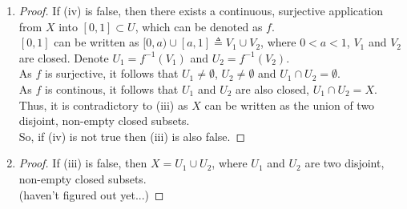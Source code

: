 \documentclass[paper=a4, fontsize=11pt]{scrartcl} %
\numberwithin{equation}{section} %
\numberwithin{figure}{section} %
\numberwithin{table}{section} %
\begin{document}
\begin{enumerate}
\begin{proof}
\begin{enumerate}
					So, $U_1$ and $U_2$ are both open and closed in $X$, which is contradictory to (i).\\
					Thus the assumption fails and (iii) is true when (i) is true.
				\item (iii) $\Rightarrow$ (i)\\
					Suppose (i) is not true, which means there exists $U$ s.t. $U \subset X$, $U \neq \emptyset$ and $U$ is both open and closed in $X$.\\
					Thus, $U^\complement$ is closed as $U$ is open.\\
					As $X = U \cup U^\complement$, then $X$ can be written as the union of two disjoint, non-empty closed subsets, which is contradictory to (iii).\\
					Thus the assumption fails and (i) holds true when (iii) is true. 
			\end{enumerate}
		\end{proof}
	\item
		\begin{proof}
			If (iv) is false, then there exists a continuous, surjective application from $X$ into $[0, 1]\subset U$, which can be denoted as $f$.\\
			$[0, 1]$ can be written as $[0, a) \cup [a, 1] \triangleq V_1 \cup V_2$, where $0 < a < 1$, $V_1$ and $V_2$ are closed. Denote $U_1 = f^{-1}(V_1)$ and  $U_2 = f^{-1}(V_2)$. \\
			As $f$ is surjective, it follows that $U_1 \neq \emptyset$, $U_2 \neq \emptyset$ and $U_1 \cap U_2 = \emptyset$. \\
			As $f$ is continous, it follows that $U_1$ and $U_2$ are also closed, $U_1 \cap U_2 = X$.\\
			Thus, it is contradictory to (iii) as $X$ can be written as the union of two disjoint, non-empty closed subsets.\\
			So, if (iv) is not true then (iii) is also false.
		\end{proof}
	\item 
		\begin{proof}
			If (iii) is false, then $X = U_1 \cup U_2$, where $U_1$ and $U_2$ are two disjoint, non-empty closed subsets.\\
			(haven't figured out yet...)
		\end{proof}
\end{enumerate}


\end{document}
